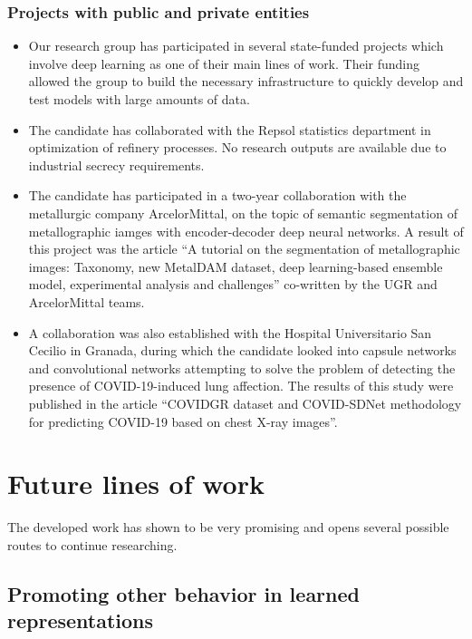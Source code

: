 \subsubsection{Projects with public and private entities}

\begin{itemize}
    \item Our research group has participated in several state-funded projects which involve deep learning as one of their main lines of work. Their funding allowed the group to build the necessary infrastructure to quickly develop and test models with large amounts of data.
    \item The candidate has collaborated with the Repsol statistics department in optimization of refinery processes. No research outputs are available due to industrial secrecy requirements.
    \item The candidate has participated in a two-year collaboration with the metallurgic company ArcelorMittal, on the topic of semantic segmentation of metallographic iamges with encoder-decoder deep neural networks. A result of this project was the article ``A tutorial on the segmentation of metallographic images: Taxonomy, new MetalDAM dataset, deep learning-based ensemble model, experimental analysis and challenges'' co-written by the UGR and ArcelorMittal teams.
    \item A collaboration was also established with the Hospital Universitario San Cecilio in Granada, during which the candidate looked into capsule networks and convolutional networks attempting to solve the problem of detecting the presence of COVID-19-induced lung affection. The results of this study were published in the article ``COVIDGR dataset and COVID-SDNet methodology for predicting COVID-19 based on chest X-ray images''.
\end{itemize}

\section{Future lines of work}

The developed work has shown to be very promising and opens several possible routes to continue researching. 

\subsection{Promoting other behavior in learned representations}

